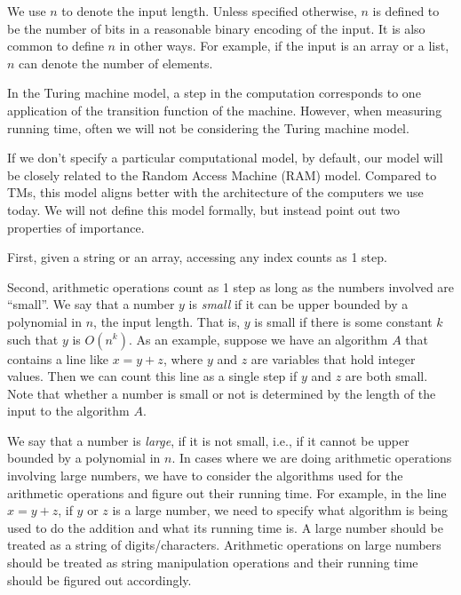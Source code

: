 \begin{important} \label{important:Input-length}
We use $n$ to denote the input length. Unless specified otherwise, $n$ is defined to be the number of bits in a reasonable binary encoding of the input. It is also common to define $n$ in other ways. For example, if the input is an array or a list, $n$ can denote the number of elements.
\end{important} 


\begin{important} \label{important:Our-model-when-measuring-running-time}
In the Turing machine model, a step in the computation corresponds to one application of the transition function of the machine. However, when measuring running time, often we will not be considering the Turing machine model.

If we don't specify a particular computational model, by default, our model will be closely related to the Random Access Machine (RAM) model. Compared to TMs, this model aligns better with the architecture of the computers we use today. We will not define this model formally, but instead point out two properties of importance. 

First, given a string or an array, accessing any index counts as 1 step. 

Second, arithmetic operations count as 1 step as long as the numbers involved are ``small''. We say that a number $y$ is \emph{small} if it can be upper bounded by a polynomial in $n$, the input length. That is, $y$ is small if there is some constant $k$ such that $y$ is $O(n^k)$. As an example, suppose we have an algorithm $A$ that contains a line like $x = y + z$, where $y$ and $z$ are variables that hold integer values. Then we can count this line as a single step if $y$ and $z$ are both small. Note that whether a number is small or not is determined by the length of the input to the algorithm $A$.

We say that a number is \emph{large}, if it is not small, i.e., if it cannot be upper bounded by a polynomial in $n$. In cases where we are doing arithmetic operations involving large numbers, we have to consider the algorithms used for the arithmetic operations and figure out their running time. For example, in the line $x = y + z$, if $y$ or $z$ is a large number, we need to specify what algorithm is being used to do the addition and what its running time is. A large number should be treated as a string of digits/characters. Arithmetic operations on large numbers should be treated as string manipulation operations and their running time should be figured out accordingly.
\end{important}


